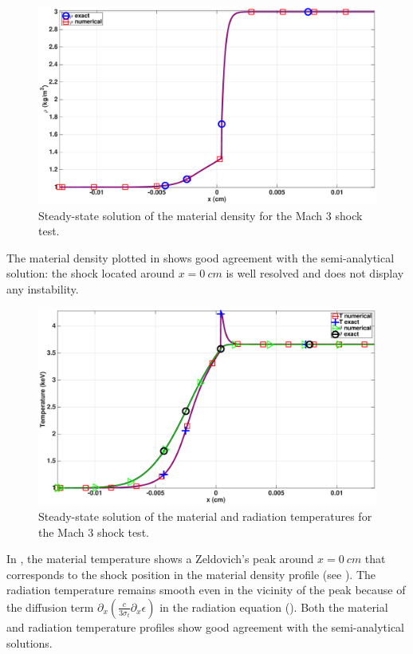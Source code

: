 \documentclass[times]{fldauth}
\begin{document}
\begin{figure}[H]
    \centering
    \includegraphics[width=\textwidth]{figures/cst-xs/mach_3_cst_xs_nel_1000_density.eps}
    \caption{Steady-state solution of the material density for the Mach 3 shock test.}\label{fig:mach-3-cst-xs-dens}
\end{figure}
%
The material density plotted in  shows good agreement with the semi-analytical solution: the shock located around $x=0 \ cm$ is well resolved and does not display any instability.
%
\begin{figure}[H]
    \centering
    \includegraphics[width=\textwidth]{figures/cst-xs/mach_3_cst_xs_nel_1000_temperature.eps}
    \caption{Steady-state solution of the material and radiation temperatures for the Mach 3 shock test.}\label{fig:mach-3-cst-xs-temp}
\end{figure}
%
In , the material temperature shows a Zeldovich's peak around $x=0 \ cm$ that corresponds to the shock position in the material density profile (see ). The radiation temperature remains smooth even in the vicinity of the peak because of the diffusion term $ \partial_x \left( \frac{c}{3 \sigma_t} \partial_x \epsilon \right)$ in the radiation equation (). Both the material and radiation temperature profiles show good agreement with the semi-analytical solutions.
\end{document}
